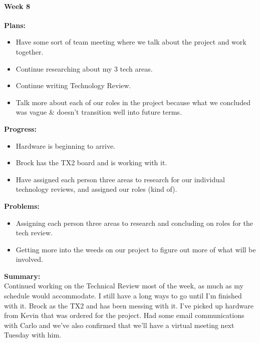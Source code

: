 \paragraph{Week 8}
\begin{adjustwidth}{2.5em}{0pt}
    \vspace{-0.5cm}\textbf{Plans:}
    \vspace{-0.5cm}
    \begin{itemize}
        \item Have some sort of team meeting where we talk about the project and work together.
		\item Continue researching about my 3 tech areas.
		\item Continue writing Technology Review.
		\item Talk more about each of our roles in the project because what we concluded was vague \& doesn't transition well into future terms. 
    \end{itemize} 
    \vspace{-0.3cm}\textbf{Progress:}
    \vspace{-0.5cm}
    \begin{itemize}
        \item Hardware is beginning to arrive.
		\item Brock has the TX2 board and is working with it.
		\item Have assigned each person three areas to research for our individual technology reviews, and assigned our roles (kind of).
    \end{itemize} 
    \vspace{-0.3cm}\textbf{Problems:}
    \vspace{-0.5cm}
    \begin{itemize}
        \item Assigning each person three areas to research and concluding on roles for the tech review. 
		\item Getting more into the weeds on our project to figure out more of what will be involved.
    \end{itemize}  
    \vspace{-0.3cm}\noindent\textbf{Summary:}\\
    \noindent Continued working on the Technical Review most of the week, as much as my schedule would accommodate. I still have a long ways to go until I'm finished with it. Brock as the TX2 and has been messing with it. I've picked up hardware from Kevin that was ordered for the project. Had some email communications with Carlo and we've also confirmed that we'll have a virtual meeting next Tuesday with him. 
\end{adjustwidth} 

